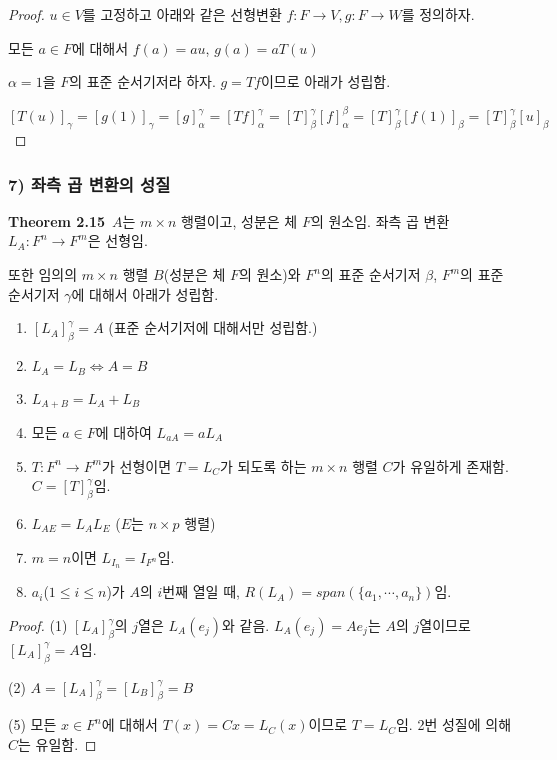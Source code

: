 \begin{proof}
$u \in V$를 고정하고 아래와 같은 선형변환 $f:F \rightarrow V,g:F \rightarrow W$를 정의하자.

\begin{center}
모든 $a \in F$에 대해서 $f(a)=au$, $g(a)=aT(u)$
\end{center}

$\alpha={1}$을 $F$의 표준 순서기저라 하자. $g =Tf$이므로 아래가 성립함.

\[
[T(u)]_{\gamma}=[g(1)]_{\gamma}=[g]_{\alpha}^{\gamma}=[Tf]_{\alpha}^{\gamma}=[T]_{\beta}^{\gamma}[f]_{\alpha}^{\beta}=[T]_{\beta}^{\gamma}[f(1)]_{\beta}=[T]_{\beta}^{\gamma}[u]_{\beta}
\]

\end{proof}

\subsubsection*{7) 좌측 곱 변환의 성질}
\textbf{Theorem 2.15}\, $A$는 $m \times n$ 행렬이고, 성분은 체 $F$의 원소임. 좌측 곱 변환 $L_A:F^n \rightarrow F^m$은 선형임.

또한 임의의 $m \times n$ 행렬 $B$(성분은 체 $F$의 원소)와 $F^n$의 표준 순서기저 $\beta$, $F^m$의 표준 순서기저 $\gamma$에 대해서 아래가 성립함.

\begin{enumerate}
    \item $[L_A]_{\beta}^{\gamma}=A$ (표준 순서기저에 대해서만 성립함.)
    \item $L_A=L_B \Longleftrightarrow A=B$
    \item $L_{A+B}=L_A+L_B$
    \item 모든 $a \in F$에 대하여 $L_{aA}=aL_A$
    \item $T:F^n \rightarrow F^m$가 선형이면 $T=L_C$가 되도록 하는 $m \times n$ 행렬 $C$가 유일하게 존재함. $C=[T]_{\beta}^{\gamma}$임.
    \item $L_{AE}=L_{A}L_{E}$ ($E$는 $n \times p$ 행렬)
    \item $m=n$이면 $L_{I_n}=I_{F^n}$임.
    \item $a_i$($1 \leq i \leq n$)가 $A$의 $i$번째 열일 때, $R(L_A)=span(\{a_1, \cdots ,a_n\})$임.
\end{enumerate}

\begin{proof}
    (1) $[L_A]_{\beta}^{\gamma}$의 $j$열은 $L_A(e_j)$와 같음. $L_A(e_j)=Ae_j$는 $A$의 $j$열이므로 $[L_A]_{\beta}^{\gamma}=A$임.
    
    (2) $A=[L_A]_{\beta}^{\gamma}=[L_B]_{\beta}^{\gamma}=B$
    
    (5) 모든 $x \in F^n$에 대해서 $T(x)=Cx=L_C(x)$이므로 $T=L_C$임. 2번 성질에 의해 $C$는 유일함.
\end{proof}

